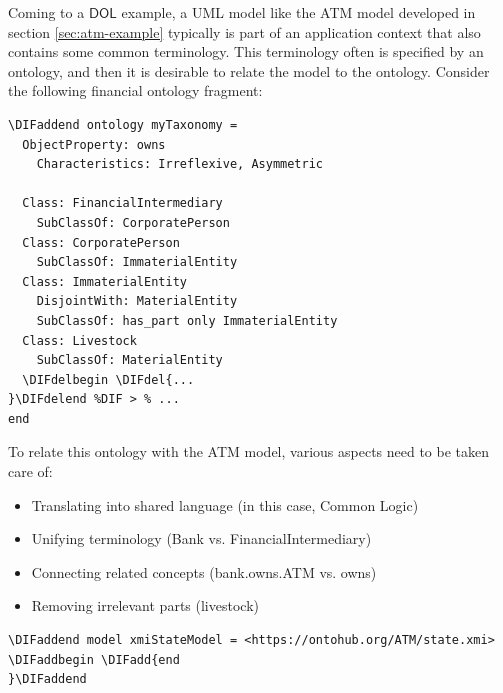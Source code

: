 \documentclass[10pt,fleqn,final]{scrreprt}
\newcommand*{\DOL}{\ensuremath{\mathsf{DOL}}\xspace}
\newenvironment{definitions}[0]{\medskip }{}
\providecommand{\DIFadd}[1]{{\protect\color{blue}\uwave{#1}}} %
\providecommand{\DIFdel}[1]{{\protect\color{red}\sout{#1}}}                      %
\providecommand{\DIFaddbegin}{} %
\providecommand{\DIFaddend}{} %
\providecommand{\DIFdelbegin}{} %
\providecommand{\DIFdelend}{} %
\begin{document}
\begin{definitions}
Coming to a \DOL example,
a UML model like the ATM model developed in section \ref{sec:atm-example} typically is part of an
application context that also contains some common terminology.
This terminology often is specified by an ontology, and then
it is desirable to relate the model to the ontology. Consider
the following financial ontology fragment:

\DIFdelbegin %
\DIFdelend \DIFaddbegin \begin{lstlisting}[basicstyle=\ttfamily,language=dolText,alsolanguage=owl2Manchester,escapechar=@,mathescape]
\DIFaddend ontology myTaxonomy =
  ObjectProperty: owns
    Characteristics: Irreflexive, Asymmetric

  Class: FinancialIntermediary
    SubClassOf: CorporatePerson
  Class: CorporatePerson
    SubClassOf: ImmaterialEntity
  Class: ImmaterialEntity
    DisjointWith: MaterialEntity
    SubClassOf: has_part only ImmaterialEntity
  Class: Livestock
    SubClassOf: MaterialEntity
  \DIFdelbegin \DIFdel{...
}\DIFdelend %DIF > % ...
end
\end{lstlisting}

 To relate this ontology with the ATM model, 
various aspects need to be taken care of:
\begin{itemize}
  \item Translating into shared language  (in this case, Common Logic)
  \item Unifying terminology (Bank vs. FinancialIntermediary)
  \item Connecting related concepts (bank.owns.ATM vs. owns)
  \item Removing irrelevant parts (livestock) 
\end{itemize}

\DIFdelbegin %
\DIFdelend \DIFaddbegin \begin{lstlisting}[basicstyle=\ttfamily\small,language=dolText,alsolanguage=owl2Manchester,escapechar=@,mathescape]
\DIFaddend model xmiStateModel = <https://ontohub.org/ATM/state.xmi> \DIFaddbegin \DIFadd{end
}\DIFaddend 


\end{lstlisting}
\end{definitions}
\end{document}
